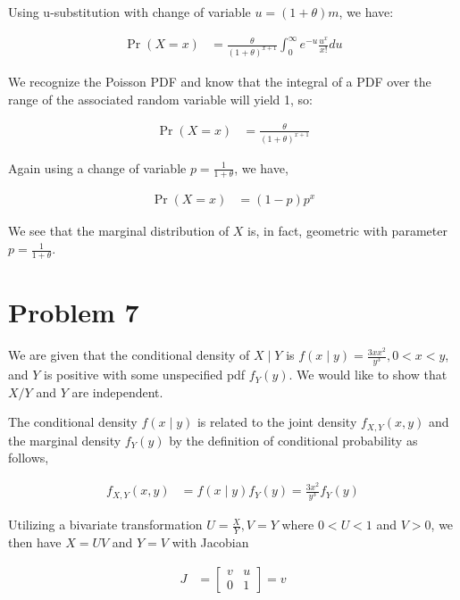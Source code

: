 \documentclass[11pt]{article}
\begin{document}
Using u-substitution with change of variable $u = (1+\theta)m$, we
have:

\begin{align*}
  \Pr{(X=x)} &= \frac{\theta}{(1+\theta)^{x+1}} \int_0^{\infty} e^{-u}
               \frac{u^x}{x!} du
\end{align*}

We recognize the Poisson PDF and know that the integral of a PDF over
the range of the associated random variable will yield 1, so:

\begin{align*}
  \Pr{(X=x)} &= \frac{\theta}{(1+\theta)^{x+1}}
\end{align*}

Again using a change of variable $p = \frac{1}{1+\theta}$, we have,

\begin{align*}
  \Pr{(X=x)} &= (1-p)p^x
\end{align*}

We see that the marginal distribution of $X$ is, in fact, geometric with parameter $p =
\frac{1}{1+\theta}$.

\section*{Problem 7}

We are given that the conditional density of $X \mid Y$ is $f(x \mid
y) = \frac{3xx^2}{y^3}, 0<x<y$, and $Y$ is positive with some
unspecified pdf $f_Y(y)$.  We would like to show that $X/Y$ and $Y$
are independent.

The conditional density $f(x \mid y)$ is related to the joint density
$f_{X,Y}(x,y)$ and the marginal density $f_Y(y)$ by the definition of
conditional probability as follows,

\begin{align*}
  f_{X,Y}(x,y) &= f(x \mid y) f_Y(y) = \frac{3x^2}{y^3} f_Y(y)
\end{align*}

Utilizing a bivariate transformation $U = \frac{X}{Y}, V = Y$ where
$0<U<1$ and $V>0$, we then have $X = UV$ and $Y=V$ with Jacobian

\begin{align*}
  J &= \begin{bmatrix} v & u \\ 0 & 1 \end{bmatrix} = v
\end{align*}
\end{document}
